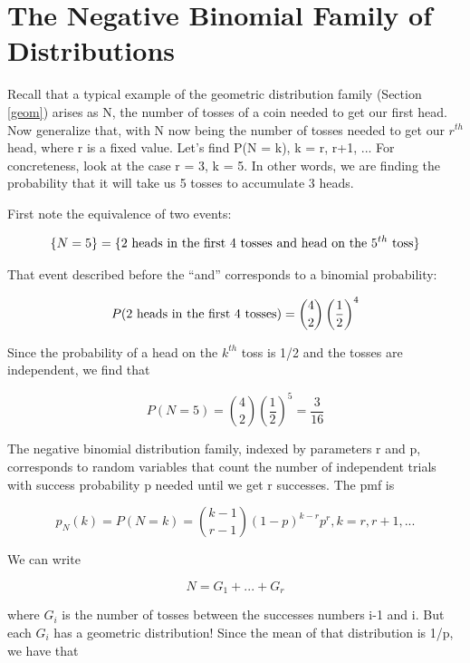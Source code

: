 \section{The Negative Binomial Family of Distributions}
\label{negbin}

Recall that a typical example of the geometric distribution family
(Section \ref{geom}) arises as N, the number of tosses of a coin needed
to get our first head.  Now generalize that, with N now being the number
of tosses needed to get our $r^{th}$ head, where r is a fixed value.
Let's find P(N = k), k = r, r+1, ...  For concreteness, look at the case
r = 3, k = 5.  In other words, we are finding the probability that it
will take us 5 tosses to accumulate 3 heads.

First note the equivalence of two events: 

\begin{equation}
\{N = 5\} = \{2 {\rm ~heads~in~the~first~} 4 {\rm ~tosses~and~head~on~the~}
5^{th} {\rm ~toss} \}
\end{equation}

That event described before the ``and'' corresponds to a binomial
probability:

\begin{equation}
P(2 {\rm ~heads~in~the~first~4~tosses}) = \binom{4}{2}
\left (\frac{1}{2} \right )^{4}
\end{equation}

Since the probability of a head on the $k^{th}$ toss is 1/2 and the
tosses are independent, we find that

\begin{equation}
P(N = 5) =  \binom{4}{2} \left (\frac{1}{2} \right )^5 = \frac{3}{16}
\end{equation}

The negative binomial distribution family, indexed by parameters r and
p, corresponds to random variables that count the number of independent
trials with success probability p needed until we get r successes.  The
pmf is

\begin{equation}
\label{negbinpmf}
p_N(k) = P(N = k) =  \binom{k-1}{r-1} (1-p)^{k-r} p^r, k = r, r+1, ...
\end{equation}

We can write

\begin{equation}
N = G_1+...+G_r
\end{equation}

where $G_i$ is the number of tosses between the successes numbers i-1
and i.  But each $G_i$ has a geometric distribution!  Since the mean of
that distribution is 1/p, we have that

